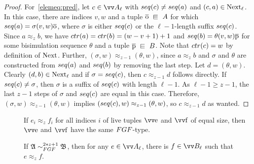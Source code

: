 \begin{proof}
  For~\ref{elemeq:pred}, let $c \in \unraveldom{A}_{\ell}$ with $\seq{c} \neq \seq{a}$ and $(c,a) \in \mathrm{Next}_{\ell}$.
  In this case, there are indices $v,w$ and a tuple $\elemtupleo \sqin A$ for which $\seq{a} = \sigma (v,w) \elemtupleo$, where $\sigma$ is either $\seq{c}$ or the $\ell-1$-length suffix $\seq{c}$.
  Since $a \approx_{z} b$, we have $\ctr{a} = \ctr{b} = (w-v+1) + 1$ and $\seq{b} = \theta (v,w) \elemtuplep$ for some bisimulation sequence $\theta$ and a tuple $\elemtuplep \sqin B$.
  Note that $\ctr{c} = w$ by definition of $\mathrm{Next}$.
  Further, $(\sigma, w) \approx_{z-1} (\theta, w)$, since $a \approx_{z} b$ and $\sigma$ and $\theta$ are constructed from $\seq{a}$ and $\seq{b}$ by removing the last step.
  Let $d = (\theta, w)$.
  Clearly $(d,b) \in \mathrm{Next}_{\ell}$ and if $\sigma = \seq{c}$, then $c \approx_{z-1} d$ follows directly.
  If $\seq{c} \neq \sigma$, then $\sigma$ is a suffix of $\seq{c}$ with length $\ell-1$.
  As $\ell-1 \ge z-1$, the last $z-1$ steps of $\sigma$ and $\seq{c}$ are equal in this case.
  Therefore, $(\sigma, w) \approx_{z-1} (\theta, w)$ implies $(\seq{c}, w) \approx_{z-1} (\theta, w)$, so $c \approx_{z-1} d$ as wanted.
  \end{proof}
\begin{description}
\item[] If $e_{i} \approx_{z} f_{i}$ for all indices $i$ of live tuples $\elemtuptuplee$ and $\elemtuptuplef$ of equal size, then $\elemtuptuplee$ and $\elemtuptuplef$ have the same $\FGF$-type.
  \item[] If $\str{A} \bisimto_{\FGF}^{2*z + 1} \str{B}$, then for any $e \in \unraveldom{A}_{\ell}$, there is $f \in \unraveldom{B}_{\ell}$ such that $e \approx_{z} f$.
\end{description}

